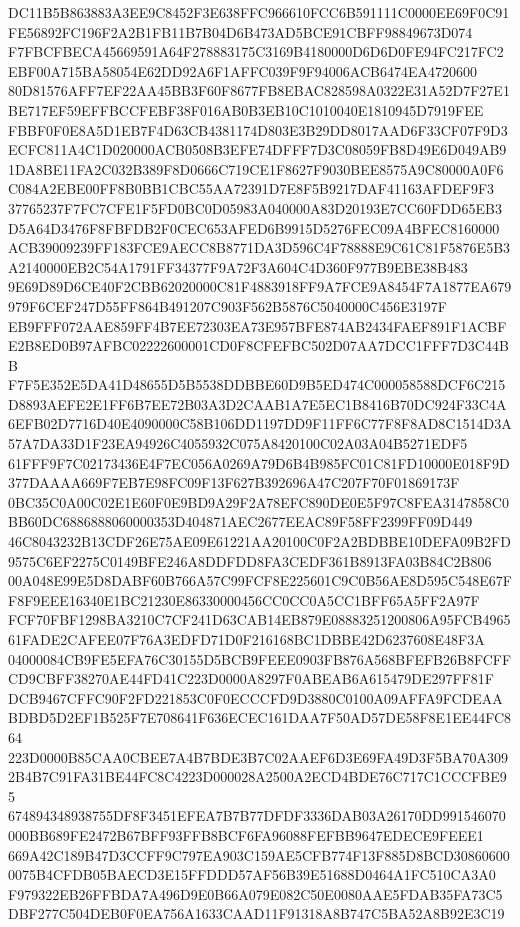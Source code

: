 \documentclass[UTF8,fontset=fandol,zihao=-4,a4paper]{ctexart}
\begin{document}
{{DC11B5B863883A3EE9C8452F3E638FFC966610FCC6B591111C0000EE69F0C91FE56892FC196F2A2B1FB11B7B04D6B473AD5BCE91CBFF98849673D074
F7FBCFBECA45669591A64F278883175C3169B4180000D6D6D0FE94FC217FC2EBF00A715BA58054E62DD92A6F1AFFC039F9F94006ACB6474EA4720600
80D81576AFF7EF22AA45BB3F60F8677FB8EBAC828598A0322E31A52D7F27E1BE717EF59EFFBCCFEBF38F016AB0B3EB10C1010040E1810945D7919FEE
FBBF0F0E8A5D1EB7F4D63CB4381174D803E3B29DD8017AAD6F33CF07F9D3ECFC811A4C1D020000ACB0508B3EFE74DFFF7D3C08059FB8D49E6D049AB9
1DA8BE11FA2C032B389F8D0666C719CE1F8627F9030BEE8575A9C80000A0F6C084A2EBE00FF8B0BB1CBC55AA72391D7E8F5B9217DAF41163AFDEF9F3
37765237F7FC7CFE1F5FD0BC0D05983A040000A83D20193E7CC60FDD65EB3D5A64D3476F8FBFDB2F0CEC653AFED6B9915D5276FEC09A4BFEC8160000
ACB39009239FF183FCE9AECC8B8771DA3D596C4F78888E9C61C81F5876E5B3A2140000EB2C54A1791FF34377F9A72F3A604C4D360F977B9EBE38B483
9E69D89D6CE40F2CBB62020000C81F4883918FF9A7FCE9A8454F7A1877EA679979F6CEF247D55FF864B491207C903F562B5876C5040000C456E3197F
EB9FFF072AAE859FF4B7EE72303EA73E957BFE874AB2434FAEF891F1ACBFE2B8ED0B97AFBC02222600001CD0F8CFEFBC502D07AA7DCC1FFF7D3C44BB
F7F5E352E5DA41D48655D5B5538DDBBE60D9B5ED474C000058588DCF6C215D8893AEFE2E1FF6B7EE72B03A3D2CAAB1A7E5EC1B8416B70DC924F33C4A
6EFB02D7716D40E4090000C58B106DD1197DD9F11FF6C77F8F8AD8C1514D3A57A7DA33D1F23EA94926C4055932C075A8420100C02A03A04B5271EDF5
61FFF9F7C02173436E4F7EC056A0269A79D6B4B985FC01C81FD10000E018F9D377DAAAA669F7EB7E98FC09F13F627B392696A47C207F70F01869173F
0BC35C0A00C02E1E60F0E9BD9A29F2A78EFC890DE0E5F97C8FEA3147858C0BB60DC6886888060000353D404871AEC2677EEAC89F58FF2399FF09D449
46C8043232B13CDF26E75AE09E61221AA20100C0F2A2BDBBE10DEFA09B2FD9575C6EF2275C0149BFE246A8DDFDD8FA3CEDF361B8913FA03B84C2B806
00A048E99E5D8DABF60B766A57C99FCF8E225601C9C0B56AE8D595C548E67FF8F9EEE16340E1BC21230E86330000456CC0CC0A5CC1BFF65A5FF2A97F
FCF70FBF1298BA3210C7CF241D63CAB14EB879E08883251200806A95FCB496561FADE2CAFEE07F76A3EDFD71D0F216168BC1DBBE42D6237608E48F3A
04000084CB9FE5EFA76C30155D5BCB9FEEE0903FB876A568BFEFB26B8FCFFCD9CBFF38270AE44FD41C223D0000A8297F0ABEAB6A615479DE297FF81F
DCB9467CFFC90F2FD221853C0F0ECCCFD9D3880C0100A09AFFA9FCDEAABDBD5D2EF1B525F7E708641F636ECEC161DAA7F50AD57DE58F8E1EE44FC864
223D0000B85CAA0CBEE7A4B7BDE3B7C02AAEF6D3E69FA49D3F5BA70A3092B4B7C91FA31BE44FC8C4223D000028A2500A2ECD4BDE76C717C1CCCFBE95
674894348938755DF8F3451EFEA7B7B77DFDF3336DAB03A26170DD991546070000BB689FE2472B67BFF93FFB8BCF6FA96088FEFBB9647EDECE9FEEE1
669A42C189B47D3CCFF9C797EA903C159AE5CFB774F13F885D8BCD308606000075B4CFDB05BAECD3E15FFDDD57AF56B39E51688D0464A1FC510CA3A0
F979322EB26FFBDA7A496D9E0B66A079E082C50E0080AAE5FDAB35FA73C5DBF277C504DEB0F0EA756A1633CAAD11F91318A8B747C5BA52A8B92E3C19
}}
\end{document}
